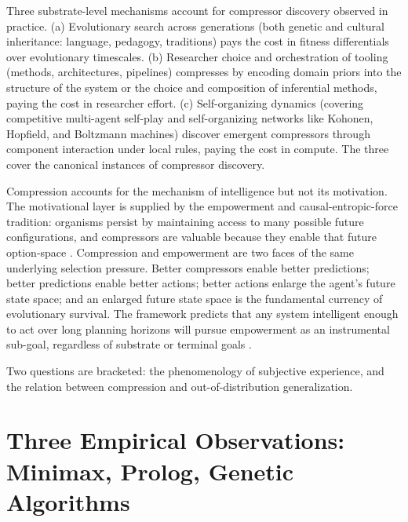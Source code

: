 \documentclass[11pt]{article}
\begin{document}
Three substrate-level mechanisms account for compressor discovery observed in practice. (a) Evolutionary search across generations (both genetic and cultural inheritance: language, pedagogy, traditions) pays the cost in fitness differentials over evolutionary timescales. (b) Researcher choice and orchestration of tooling (methods, architectures, pipelines) compresses by encoding domain priors into the structure of the system or the choice and composition of inferential methods, paying the cost in researcher effort. (c) Self-organizing dynamics (covering competitive multi-agent self-play and self-organizing networks like Kohonen, Hopfield, and Boltzmann machines) discover emergent compressors through component interaction under local rules, paying the cost in compute. The three cover the canonical instances of compressor discovery.

Compression accounts for the mechanism of intelligence but not its motivation. The motivational layer is supplied by the empowerment and causal-entropic-force tradition: organisms persist by maintaining access to many possible future configurations, and compressors are valuable because they enable that future option-space \citep{wissner_gross_2013}. Compression and empowerment are two faces of the same underlying selection pressure. Better compressors enable better predictions; better predictions enable better actions; better actions enlarge the agent's future state space; and an enlarged future state space is the fundamental currency of evolutionary survival. The framework predicts that any system intelligent enough to act over long planning horizons will pursue empowerment as an instrumental sub-goal, regardless of substrate or terminal goals \citep{bostrom2014}.

Two questions are bracketed: the phenomenology of subjective experience, and the relation between compression and out-of-distribution generalization.

\section{Three Empirical Observations: Minimax, Prolog, Genetic Algorithms}\label{sec:observations}
\end{document}
